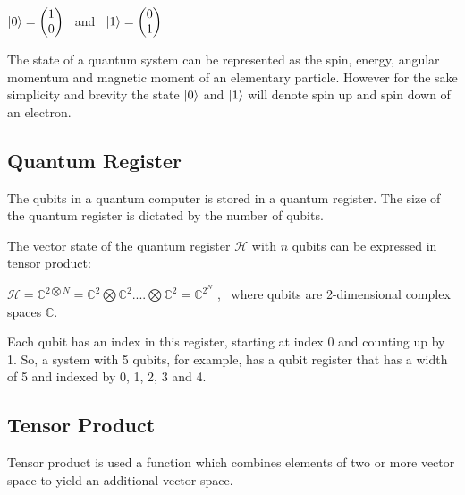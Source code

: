 \documentclass{article}
\begin{document}
\qquad $\ket{0} = \begin{pmatrix}1 \\ 0 \end{pmatrix}$ \ and \ $\ket{1} = \begin{pmatrix} 0 \\ 1 \end{pmatrix}$

\vspace{5mm}

\noindent
The state of a quantum system can be represented as the spin, energy, angular momentum and magnetic moment of an elementary particle. However for the sake simplicity and brevity the state $\ket{0}$ and $\ket{1}$ will denote spin up and spin down of an electron. 
\pagebreak

\subsection{Quantum Register}
\vspace{5mm}

\noindent
The qubits in a quantum computer is stored in a quantum register. The size of the quantum register is dictated by the number of qubits. 
\vspace{5mm}

\noindent
The vector state of the quantum register $\mathcal{H}$ with $n$ qubits can be expressed in tensor product:
\vspace{5mm}


\qquad $\mathcal{H} = \mathbb{C}^{2\bigotimes N} = \mathbb{C}^2 \bigotimes\mathbb{C}^2 ....\bigotimes\mathbb{C}^2 = \mathbb{C}^{2^N} $ , \  where qubits are 2-dimensional complex spaces $\mathbb{C}$.
\vspace{5mm}

\noindent
Each qubit has an index in this register, starting at index 0 and counting up by 1. So, a system with 5 qubits, for example, has a qubit register that has a width of 5 and indexed by 0, 1, 2, 3 and 4.

\subsection{Tensor Product}
\vspace{5mm}

\noindent
Tensor product is used a function which combines elements of two or more vector space to yield an additional vector space. 
\vspace{5mm}
\end{document}
